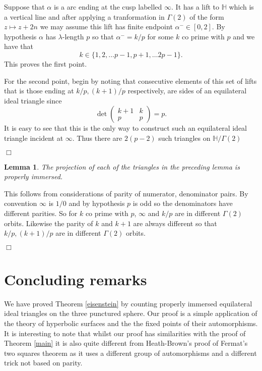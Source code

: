 \documentclass[12pt]{amsart}
\theoremstyle{plain}
\newtheorem{lemma}{Lemma}[section]
\theoremstyle{definition}
\def\HH{\mathbb{H}}
\def\xx{\HH/g2}
\def\g2{\Gamma(2)}
\def\xx{\HH/\g2}
\begin{document}
\proof Suppose that $\alpha$ is a arc ending at the cusp labelled 
$\infty$.
It has a lift to $\HH$ which is a vertical line and after 
applying a tranformation in $\Gamma(2)$ of the 
form $z \mapsto z + 2n$ we may assume this lift has finite endpoint $\alpha^- \in [0,2]$.
By hypothesis $\alpha$ has  $\lambda$-length $p$ 
so that $\alpha^- = k/p$ for some $k$ co prime with $p$
and we have that
$$ k \in \{1,2,\ldots p-1, p+ 1, \ldots 2p -1 \}.$$
This proves the first point.

For the second point, begin by  noting that consecutive elements of this set of lifts
that is those ending at $k/p, (k+1)/p$ respectively, are sides of
an equilateral ideal triangle since
$$\det \begin{pmatrix}
k + 1 & k \\ p & p 
\end{pmatrix} = p.$$
It is easy to see that this is the only way to construct such
an  equilateral ideal triangle incident at $\infty$.
Thus there are $2(p-2)$ such triangles on $\xx$

\hfill $\Box$


\begin{lemma}\label{proper}
The projection of each of the triangles in the preceding lemma
is properly immersed.
\end{lemma}

\proof This follows from considerations of parity of numerator, denominator pairs.
By convention $\infty$ is $1/0$ and 
by hypothesis $p$ is odd so the denominators have different parities. So for $k$ co prime with $p$, 
$\infty$ and $k/p$ are in different $\Gamma(2)$ orbits.
Likewise the parity of $k$ and $k+1$ are always different
so that $k/p, (k+1)/p$ are in different $\Gamma(2)$ orbits.

\hfill $\Box$


\section{Concluding remarks}

We have proved Theorem \ref{eisenstein} by counting properly
immersed equilateral ideal triangles on the three punctured sphere.
Our proof is a simple application of the theory of hyperbolic
surfaces and the the fixed points of their automorphisms.
It is interesting to note that whilst our proof has similarities
with the proof of Theorem \ref{main} it is also quite different from
Heath-Brown's proof of Fermat's two squares theorem \cite{heath} as
it uses a different group of automorphisms and a different trick not
based on parity.
\end{document}
